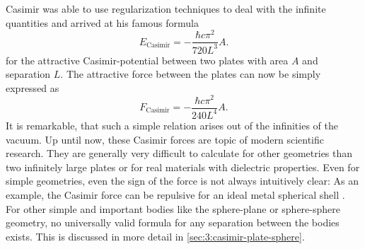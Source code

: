 Casimir was able to use regularization techniques to deal with the infinite quantities and arrived at his famous formula \cite{Casimir_1948}
\begin{equation}\label{eq:3:casimir-energy-pp-conducting}
  E_\mathrm{Casimir} = -\frac{\hbar c \pi^2}{720 L^3} A .
\end{equation}
for the attractive Casimir-potential between two plates with area $A$ and separation $L$.
The attractive force between the plates can now be simply expressed as
\begin{equation}\label{eq:3:casimir-force-pp-conducting}
  F_\mathrm{Casimir} = - \frac{\hbar c \pi^2}{240 L^4} A .
\end{equation}
It is remarkable, that such a simple relation arises out of the infinities of the vacuum.
Up until now, these Casimir forces are topic of modern scientific research. They are generally very difficult to calculate for other geometries than two infinitely large plates or for real materials with dielectric properties. 
Even for simple geometries, even the sign of the force is not always intuitively clear: As an example, the Casimir force can be repulsive for an ideal metal spherical shell \cite{Klimchitskaya_2009}.
For other simple and important bodies like the sphere-plane or sphere-sphere geometry, no universally valid formula for any separation between the bodies exists. This is discussed in more detail in \cref{sec:3:casimir-plate-sphere}.

